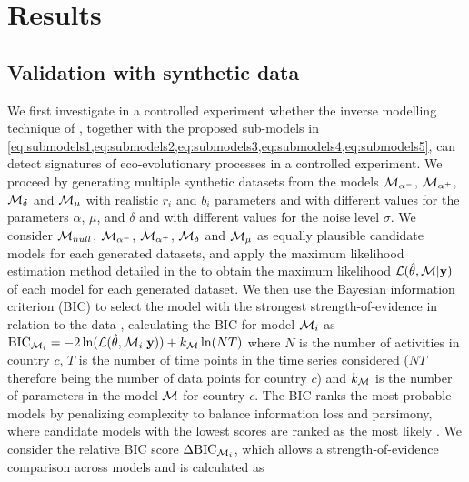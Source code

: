 

\section{Results}
\label{sec:results-minibatch}
\subsection{Validation with synthetic data}\label{sec:synthetic}
We first investigate in a controlled experiment whether the inverse modelling technique of \cite{Boussange2022a}, together with the proposed sub-models in \cref{eq:submodels1,eq:submodels2,eq:submodels3,eq:submodels4,eq:submodels5}, can detect signatures of eco-evolutionary processes in a controlled experiment.
%
We proceed by generating multiple synthetic datasets from the models $\mathcal{M}_{\alpha^-}$, $\mathcal{M}_{\alpha^+}$, $\mathcal{M}_\delta$ and $\mathcal{M}_\mu$ with realistic $r_i$ and $b_i$ parameters and with different values for the parameters $\alpha$, $\mu$, and $\delta$ and with different values for the noise level $\sigma$. We consider $\mathcal{M}_{null}$, $\mathcal{M}_{\alpha^-}$, $\mathcal{M}_{\alpha^+}$, $\mathcal{M}_\delta$ and $\mathcal{M}_\mu$ as equally plausible candidate models for each generated datasets, and apply the maximum likelihood estimation method detailed in the  to obtain the maximum likelihood $\mathcal{L}(\hat \theta, \mathcal{M} | \textbf{y})$ of each model for each generated dataset. We then use the Bayesian information criterion (BIC) to select the model with the strongest strength-of-evidence in relation to the data \citep{Mangan2017}, calculating the BIC for model $\mathcal{M}_i$ as $\text{BIC}_{\mathcal{M}_i} = -2 \ln(\mathcal{L}(\hat \theta, \mathcal{M}_i | \textbf{y})) + k_{\mathcal{M}} \ln(N T ) $
% 
where $N$ is the number of activities in country $c$, $T$ is the number of time points in the time series considered ($N T$ therefore being the number of data points for country $c$) and $k_{\mathcal{M}}$ is the number of parameters in the model $\mathcal{M}$ for country $c$.
% 
The BIC ranks the most probable models by penalizing complexity to balance information loss and parsimony, where candidate models with the lowest scores are ranked as the most likely \citep{Mangan2017}.
% 
We consider the relative BIC score $\Delta \text{BIC}_{\mathcal{M}_i}$, which allows a strength-of-evidence comparison across models and is calculated as 
